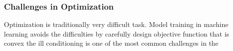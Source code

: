 \subsubsection{Challenges in Optimization}

Optimization is traditionally very difficult task. Model training in machine learning avoids the difficulties by carefully design objective function that is convex 
the ill conditioning is one of the most common challenges in the 